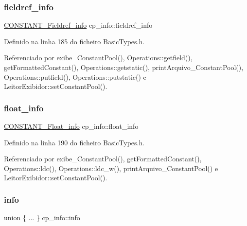 \mbox{\label{structcp__info_a12c0c04a72137ea73d22a3d652de1774}} 
\subsubsection{\texorpdfstring{fieldref\+\_\+info}{fieldref\_info}}
{\footnotesize\ttfamily \hyperlink{structCONSTANT__Fieldref__info}{C\+O\+N\+S\+T\+A\+N\+T\+\_\+\+Fieldref\+\_\+info} cp\+\_\+info\+::fieldref\+\_\+info}



Definido na linha 185 do ficheiro Basic\+Types.\+h.



Referenciado por exibe\+\_\+\+Constant\+Pool(), Operations\+::getfield(), get\+Formatted\+Constant(), Operations\+::getstatic(), print\+Arquivo\+\_\+\+Constant\+Pool(), Operations\+::putfield(), Operations\+::putstatic() e Leitor\+Exibidor\+::set\+Constant\+Pool().

\mbox{\label{structcp__info_a367569f3e0a70a50afc482c4ac2aece1}} 
\subsubsection{\texorpdfstring{float\+\_\+info}{float\_info}}
{\footnotesize\ttfamily \hyperlink{structCONSTANT__Float__info}{C\+O\+N\+S\+T\+A\+N\+T\+\_\+\+Float\+\_\+info} cp\+\_\+info\+::float\+\_\+info}



Definido na linha 190 do ficheiro Basic\+Types.\+h.



Referenciado por exibe\+\_\+\+Constant\+Pool(), get\+Formatted\+Constant(), Operations\+::ldc(), Operations\+::ldc\+\_\+w(), print\+Arquivo\+\_\+\+Constant\+Pool() e Leitor\+Exibidor\+::set\+Constant\+Pool().

\mbox{\label{structcp__info_a8aca171d81e9715b113c7919e8c16dce}} 
\subsubsection{\texorpdfstring{info}{info}}
{\footnotesize\ttfamily union \{ ... \}   cp\+\_\+info\+::info}



